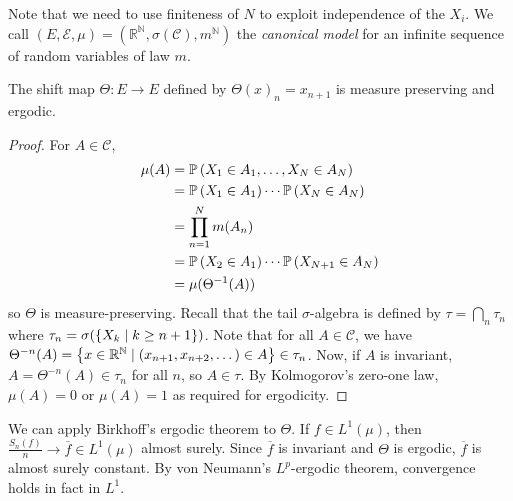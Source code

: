 Note that we need to use finiteness of \( N \) to exploit independence of the \( X_i \).
We call \( (E, \mathcal E, \mu) = (\mathbb R^{\mathbb N}, \sigma(\mathcal C), m^{\mathbb N}) \) the \emph{canonical model} for an infinite sequence of random variables of law \( m \).
\begin{theorem}
	The shift map \( \Theta \colon E \to E \) defined by \( \Theta(x)_n = x_{n+1} \) is measure preserving and ergodic.
\end{theorem}
\begin{proof}
	For \( A \in \mathcal C \),
	\begin{align*}
			\mu(A) &= \mathbb{P}\left({X_1 \in A_1, \dots, X_N \in A_N}\right) \\
			&= \mathbb{P}\left({X_1 \in A_1}\right) \cdots \mathbb{P}\left({X_N \in A_N}\right) \\
			&= \prod_{n=1}^N m(A_n) \\
			&= \mathbb{P}\left({X_2 \in A_1}\right) \cdots \mathbb{P}\left({X_{N+1} \in A_N}\right) \\
			&= \mu(\Theta^{-1}(A))
	\end{align*}
	so \( \Theta \) is measure-preserving.
	Recall that the tail \( \sigma \)-algebra is defined by \( \tau = \bigcap_n \tau_n \) where \( \tau_n = \sigma(\qty{X_k \mid k \geq n + 1}) \).
	Note that for all \( A \in \mathcal C \), we have \( \Theta^{-n}(A) = \qty{x \in \mathbb R^{\mathbb N} \mid (x_{n+1}, x_{n+2}, \dots) \in A} \in \tau_n \).
	Now, if \( A \) is invariant, \( A = \Theta^{-n}(A) \in \tau_n \) for all \( n \), so \( A \in \tau \).
	By Kolmogorov's zero-one law, \( \mu(A) = 0 \) or \( \mu(A) = 1 \) as required for ergodicity.
\end{proof}
We can apply Birkhoff's ergodic theorem to \( \Theta \).
If \( f \in L^1(\mu) \), then \( \frac{S_n(f)}{n} \to \overline f \in L^1(\mu) \) almost surely.
Since \( \overline f \) is invariant and \( \Theta \) is ergodic, \( \overline f \) is almost surely constant.
By von Neumann's \( L^p \)-ergodic theorem, convergence holds in fact in \( L^1 \).

